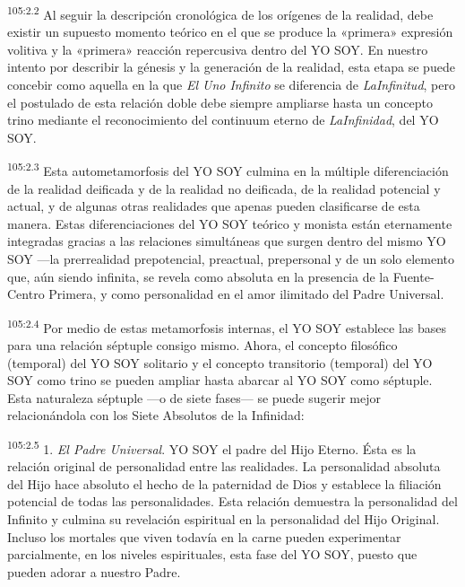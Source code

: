 \par
\textsuperscript{105:2.2} Al seguir la descripción cronológica de los orígenes de la realidad, debe existir un supuesto momento teórico en el que se produce la «primera» expresión volitiva y la «primera» reacción repercusiva dentro del YO SOY. En nuestro intento por describir la génesis y la generación de la realidad, esta etapa se puede concebir como aquella en la que \textit{El Uno Infinito} se diferencia de \textit{LaInfinitud}, pero el postulado de esta relación doble debe siempre ampliarse hasta un concepto trino mediante el reconocimiento del continuum eterno de \textit{LaInfinidad}, del YO SOY.

\par
\textsuperscript{105:2.3} Esta autometamorfosis del YO SOY culmina en la múltiple diferenciación de la realidad deificada y de la realidad no deificada, de la realidad potencial y actual, y de algunas otras realidades que apenas pueden clasificarse de esta manera. Estas diferenciaciones del YO SOY teórico y monista están eternamente integradas gracias a las relaciones simultáneas que surgen dentro del mismo YO SOY ---la prerrealidad prepotencial, preactual, prepersonal y de un solo elemento que, aún siendo infinita, se revela como absoluta en la presencia de la Fuente-Centro Primera, y como personalidad en el amor ilimitado del Padre Universal.

\par
\textsuperscript{105:2.4} Por medio de estas metamorfosis internas, el YO SOY establece las bases para una relación séptuple consigo mismo. Ahora, el concepto filosófico (temporal) del YO SOY solitario y el concepto transitorio (temporal) del YO SOY como trino se pueden ampliar hasta abarcar al YO SOY como séptuple. Esta naturaleza séptuple ---o de siete fases--- se puede sugerir mejor relacionándola con los Siete Absolutos de la Infinidad:

\par
\textsuperscript{105:2.5} 1. \textit{El Padre Universal}. YO SOY el padre del Hijo Eterno. Ésta es la relación original de personalidad entre las realidades. La personalidad absoluta del Hijo hace absoluto el hecho de la paternidad de Dios y establece la filiación potencial de todas las personalidades. Esta relación demuestra la personalidad del Infinito y culmina su revelación espiritual en la personalidad del Hijo Original. Incluso los mortales que viven todavía en la carne pueden experimentar parcialmente, en los niveles espirituales, esta fase del YO SOY, puesto que pueden adorar a nuestro Padre.

